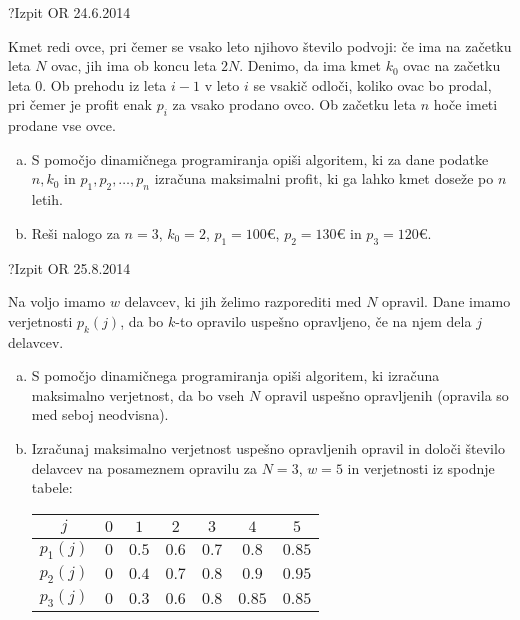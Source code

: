 \begin{naloga}{?}{Izpit OR 24.6.2014}
\begin{vprasanje}
Kmet redi ovce, pri čemer se vsako leto njihovo število podvoji:
če ima na začetku leta $N$ ovac, jih ima ob koncu leta $2N$.
Denimo, da ima kmet $k_0$ ovac na začetku leta $0$.
Ob prehodu iz leta $i-1$ v leto $i$ se vsakič odloči,
koliko ovac bo prodal, pri čemer je profit enak $p_i$ za vsako prodano ovco.
Ob začetku leta $n$ hoče imeti prodane vse ovce.

\begin{enumerate}[(a)]
\item S pomočjo dinamičnega programiranja opiši algoritem,
ki za dane podatke $n, k_0$ in $p_1, p_2, \dots, p_n$
izračuna maksimalni profit, ki ga lahko kmet doseže po $n$ letih.

\item Reši nalogo za $n = 3$, $k_0 = 2$,
$p_1 = 100 €$, $p_2 = 130 €$ in $p_3 = 120 €$.
\end{enumerate}
\end{vprasanje}
\begin{odgovor}
\end{odgovor}
\end{naloga}


\begin{naloga}{?}{Izpit OR 25.8.2014}
\begin{vprasanje}
Na voljo imamo $w$ delavcev, ki jih želimo razporediti med $N$ opravil.
Dane imamo verjetnosti $p_k(j)$,
da bo $k$-to opravilo uspešno opravljeno, če na njem dela $j$ delavcev.

\begin{enumerate}[(a)]
\item S pomočjo dinamičnega programiranja opiši algoritem,
ki izračuna maksimalno verjetnost,
da bo vseh $N$ opravil uspešno opravljenih (opravila so med seboj neodvisna).

\item Izračunaj maksimalno verjetnost uspešno opravljenih opravil
in določi število delavcev na posameznem opravilu
za $N = 3$, $w = 5$ in verjetnosti iz spodnje tabele:
\begin{center}
\begin{tabular}{c|cccccc}
$j$ & $0$ & $1$ & $2$ & $3$ & $4$ & $5$ \\ \hline
$p_1(j)$ & $0$ & $0.5$ & $0.6$ & $0.7$ & $0.8$  & $0.85$ \\
$p_2(j)$ & $0$ & $0.4$ & $0.7$ & $0.8$ & $0.9$  & $0.95$ \\
$p_3(j)$ & $0$ & $0.3$ & $0.6$ & $0.8$ & $0.85$ & $0.85$
\end{tabular}
\end{center}
\end{enumerate}
\end{vprasanje}
\begin{odgovor}
\end{odgovor}
\end{naloga}


